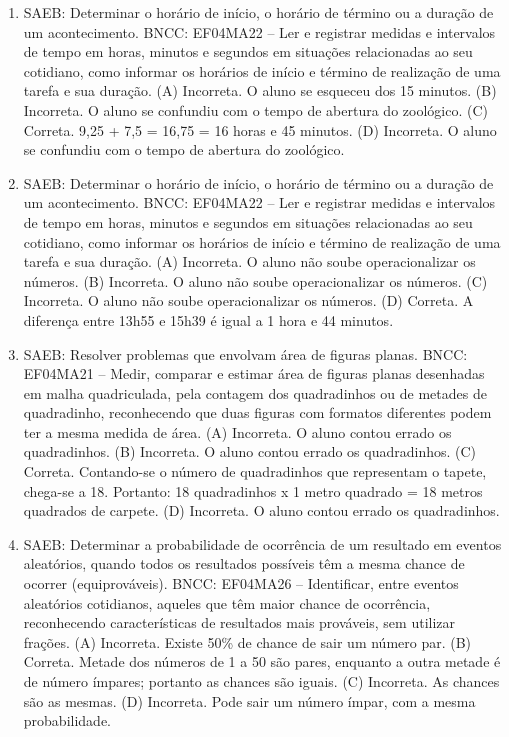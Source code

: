 \begin{enumerate}
\item
SAEB: Determinar o horário de início, o horário de término ou
a duração de um acontecimento.
BNCC: EF04MA22 -- Ler e registrar medidas e intervalos de tempo em horas, minutos e segundos em
situações relacionadas ao seu cotidiano, como informar os horários de início e término de realização
de uma tarefa e sua duração.
(A) Incorreta. O aluno se esqueceu dos 15 minutos.
(B) Incorreta. O aluno se confundiu com o tempo de abertura do zoológico.
(C) Correta. 9,25 + 7,5 = 16,75 = 16 horas e 45 minutos.
(D) Incorreta. O aluno se confundiu com o tempo de abertura do zoológico.

\item
SAEB: Determinar o horário de início, o horário de término ou
a duração de um acontecimento.
BNCC: EF04MA22 -- Ler e registrar medidas e intervalos de tempo em horas, minutos e segundos em
situações relacionadas ao seu cotidiano, como informar os horários de início e término de realização
de uma tarefa e sua duração.
(A) Incorreta. O aluno não soube operacionalizar os números.
(B) Incorreta. O aluno não soube operacionalizar os números.
(C) Incorreta. O aluno não soube operacionalizar os números.
(D) Correta. A diferença entre 13h55 e 15h39 é igual a 1 hora e 44 minutos.

\item
SAEB: Resolver problemas que envolvam área de figuras planas.
BNCC: EF04MA21 -- Medir, comparar e estimar área de figuras planas desenhadas em malha quadriculada,
pela contagem dos quadradinhos ou de metades de quadradinho, reconhecendo que duas figuras
com formatos diferentes podem ter a mesma medida de área.
(A) Incorreta. O aluno contou errado os quadradinhos.
(B) Incorreta. O aluno contou errado os quadradinhos.
(C) Correta. Contando-se o número de quadradinhos que representam o tapete, chega-se a 18. Portanto: 18 quadradinhos x 1 metro quadrado = 18 metros quadrados de carpete.
(D) Incorreta. O aluno contou errado os quadradinhos.

\item
SAEB: Determinar a probabilidade de ocorrência de um
resultado em eventos aleatórios, quando todos os resultados possíveis
têm a mesma chance de ocorrer (equiprováveis).
BNCC: EF04MA26 -- Identificar, entre eventos aleatórios cotidianos, aqueles que têm maior chance de
ocorrência, reconhecendo características de resultados mais prováveis, sem utilizar frações.
(A) Incorreta. Existe 50\% de chance de sair um número par.
(B) Correta. Metade dos números de 1 a 50 são pares, enquanto a outra metade é de número ímpares; portanto as chances são iguais.
(C) Incorreta. As chances são as mesmas.
(D) Incorreta. Pode sair um número ímpar, com a mesma probabilidade.


\end{enumerate}
